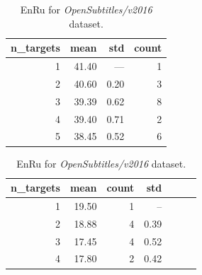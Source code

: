 \begin{table}[h!]
\begin{subtable}[t]{0.45\linewidth}
	\centering
	\begin{tabular}{rrrr}
	\toprule
	n\_targets &   mean &   std & count \\
	\midrule
	         1 &  41.40 &  ---  &   1 \\
	         2 &  40.60 &  0.20 &   3 \\
	         3 &  39.39 &  0.62 &   8 \\
	         4 &  39.40 &  0.71 &   2 \\
	         5 &  38.45 &  0.52 &   6 \\
	\bottomrule
	\end{tabular}

	\caption{
		En\to{}Bg for \emph{Europarl/v7} dataset.
		}
	\label{tab:bg/Europarl/v7}
\end{subtable}
\begin{subtable}[t]{0.45\linewidth}
	\centering
	\begin{tabular}{rrrrrrr}
	\toprule
	n\_targets & mean & count & std \\
	\midrule
	        1 &     19.50 &    1 &   --  \\
	        2 &     18.88 &    4 &  0.39 \\
	        3 &     17.45 &    4 &  0.52 \\
	        4 &     17.80 &    2 &  0.42 \\
	\bottomrule
	\end{tabular}
	
	\caption{
		En\to{}Ru for \emph{OpenSubtitles/v2016} dataset.
		}
	\label{ table:ru/OpenSubtitles/v2016 }
\end{subtable}
\end{table}



% 

